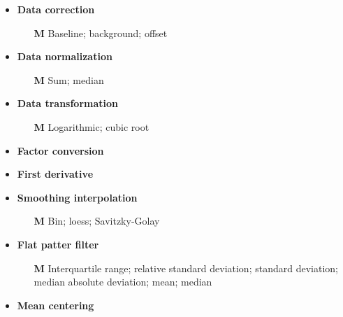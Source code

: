 \begin{multicols}{2}
	\begin{itemize}
		\item \textbf{Data correction}
		\begin{itemize}
			\item[\textbf{M}] Baseline; background; offset
		\end{itemize}
		\item \textbf{Data normalization}
		\begin{itemize}
			\item[\textbf{M}] Sum; median
		\end{itemize}
		\item \textbf{Data transformation}
		\begin{itemize}
			\item[\textbf{M}] Logarithmic; cubic root
		\end{itemize}
		\item \textbf{Factor conversion}
		\item \textbf{First derivative}
		\item \textbf{Smoothing interpolation}
		\begin{itemize}
			\item[\textbf{M}] Bin; loess; Savitzky-Golay
		\end{itemize}
		\item \textbf{Flat patter filter}
		\begin{itemize}
			\item[\textbf{M}] Interquartile range; relative standard deviation; standard deviation; median absolute deviation; mean; median
		\end{itemize}	
		\item \textbf{Mean centering}

\end{itemize}
\end{multicols}
